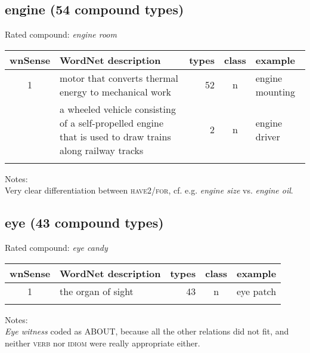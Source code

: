 \subsection{engine       (54 compound types)}
Rated compound: \emph{engine room}
\vspace*{1ex}

\noindent

\begin{longtable}{c>{\raggedright\arraybackslash}p{5cm}rc>{\raggedright\arraybackslash}p{2cm}}\lsptoprule
{\small wnSense}&WordNet description&types&class&example\\\midrule
1&motor that converts thermal energy to mechanical work&52&n&engine mounting\\\tablevspace
3&a wheeled vehicle consisting of a self-propelled engine that is used to draw trains along railway tracks&2&n&engine driver\\\lspbottomrule
\end{longtable}

\noindent
Notes: \\Very clear differentiation between \textsc{have2}/\textsc{for}, cf. e.g. \emph{engine
  size} vs. \emph{engine oil}.

\subsection{eye          (43 compound types)}
Rated compound: \emph{eye candy}

\vspace*{1ex}

\noindent
\begin{longtable}{c>{\raggedright\arraybackslash}p{5cm}rc>{\raggedright\arraybackslash}p{2cm}}\lsptoprule
{\small wnSense}&WordNet description&types&class&example\\\midrule
1&the organ of sight&43&n&eye patch\\\lspbottomrule
\end{longtable}

\noindent
Notes:\\
\emph{Eye witness} coded as ABOUT, because all the other relations did
not fit, and neither \textsc{verb}
  nor \textsc{idiom} were really appropriate either.

\pagebreak[4]
